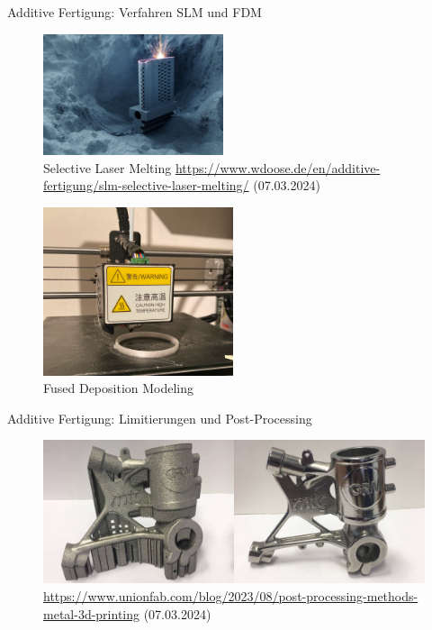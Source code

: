 \documentclass[../slides.tex]{subfiles}
\begin{document}
\begin{frame}{Additive Fertigung: Verfahren SLM und FDM}
  \begin{minipage}[t]{0.49\textwidth}
    \begin{figure}[]
      \includegraphics[width=150pt]{img_niklas/csm_h_bearb_LASERTEC_SLM_Blade_Powder_e24c562ac8.jpg}
      \caption{Selective Laser Melting {\url{https://www.wdoose.de/en/additive-fertigung/slm-selective-laser-melting/} (07.03.2024)}}
      \label{fig:slm}
    \end{figure}
  \end{minipage}
  \begin{minipage}[t]{0.49\textwidth}
    \begin{figure}[]
      \includegraphics[height=140pt]{img_niklas/3d_printer.jpg}
      \caption{Fused Deposition Modeling}
    \end{figure}
  \end{minipage}
\end{frame}

\begin{frame}{Additive Fertigung: Limitierungen und Post-Processing}
  \begin{minipage}[t]{\textwidth}
    \begin{figure}[]
      \includegraphics[width=\textwidth]{img_niklas/image-32-1024x384.png}
      \caption{{\url{https://www.unionfab.com/blog/2023/08/post-processing-methods-metal-3d-printing} (07.03.2024)}}
      \label{fig:post_processing}
    \end{figure}
  \end{minipage}
\end{frame}
\end{document}
